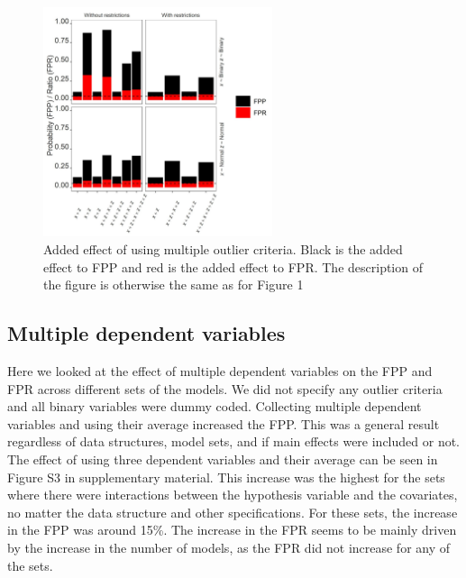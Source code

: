 \begin{figure}[t]
\includegraphics[width=0.6\textwidth]{R/Analysis/Result/Figures/Figure1B.jpeg}
\centering
\caption{Added effect of using multiple outlier criteria. Black is the added effect to FPP and red is the added effect to FPR.  The description of the figure is otherwise the same as for Figure 1}
\label{fig:mainfigure}
\end{figure}

\subsection{Multiple dependent variables}
Here we looked at the effect of multiple dependent variables on the FPP and FPR across different sets of the models. We did not specify any outlier criteria and all binary variables were dummy coded. Collecting multiple dependent variables and using their average increased the FPP. This was a general result regardless of data structures, model sets, and if main effects were included or not. The effect of using three dependent variables and their average can be seen in Figure S3 in supplementary material. This increase was the highest for the sets where there were interactions between the hypothesis variable and the covariates, no matter the data structure and other specifications. For these sets, the increase in the FPP was around 15\%. The increase in the FPR seems to be mainly driven by the increase in the number of models, as the FPR did not increase for any of the sets. 

